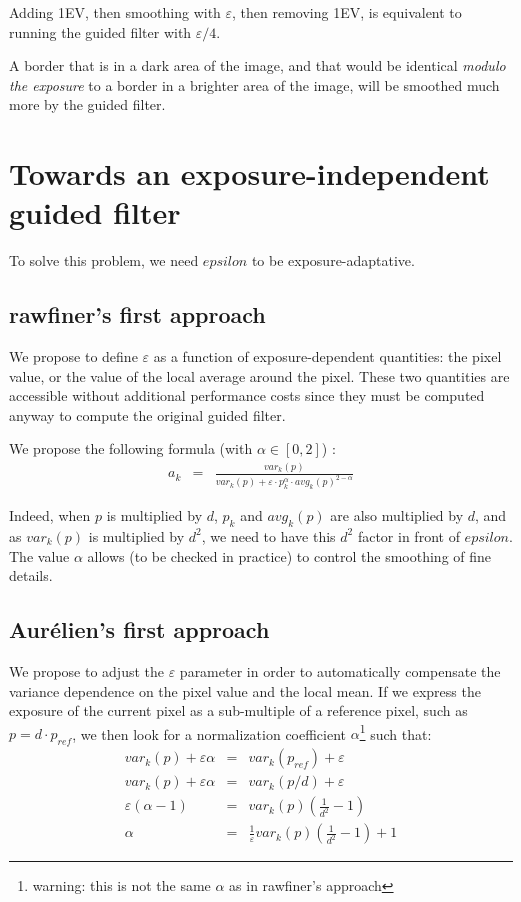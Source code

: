 \documentclass[12pt,a4paper]{article}
\begin{document}
Adding 1EV, then smoothing with $\varepsilon$, then removing 1EV, is equivalent to running the guided filter with $\varepsilon / 4$.

A border that is in a dark area of the image, and that would be identical \textit{modulo the exposure} to a border in a brighter area of the image, will be smoothed much more by the guided filter.

\section{Towards an exposure-independent guided filter}
To solve this problem, we need $epsilon$ to be exposure-adaptative.

\subsection{rawfiner's first approach}
We propose to define $\varepsilon$ as a function of exposure-dependent quantities: the pixel value, or the value of the local average around the pixel.
These two quantities are accessible without additional performance costs since they must be computed anyway to compute the original guided filter.

We propose the following formula (with $\alpha \in [0,2]$) :
\begin{eqnarray}
a_k &=& \frac{var_k(p)}{var_k(p) + \varepsilon  \cdot  p_k ^ {\alpha}  \cdot  avg_k(p) ^ {2-\alpha}} \label{first-formula}
\end{eqnarray}

Indeed, when $p$ is multiplied by $d$, $p_k$ and $avg_k(p)$ are also multiplied by $d$, and as $var_k(p)$ is multiplied by $d^2$, we need to have this $d^2$ factor in front of $epsilon$.
The value $\alpha$ allows (to be checked in practice) to control the smoothing of fine details.

\subsection{Aurélien's first approach}

We propose to adjust the $\varepsilon$ parameter in order to automatically compensate the variance dependence on the pixel value and the local mean. If we express the exposure of the current pixel as a sub-multiple of a reference pixel, such as $p = d  \cdot  p_{ref}$, we then look for a normalization coefficient $\alpha$\footnote{warning: this is not the same $\alpha$ as in rawfiner's approach} such that:
\begin{eqnarray}
var_k(p) + \varepsilon \alpha &=& var_k(p_{ref}) + \varepsilon \\
var_k(p) + \varepsilon \alpha &=& var_k(p / d) + \varepsilon\\
\varepsilon (\alpha - 1) &=&  var_k(p) \left( \frac{1}{d^2} - 1\right) \\
\alpha &=& \frac{1}{\varepsilon} var_k(p)  \left( \frac{1}{d^2} - 1\right) + 1
\end{eqnarray}
\end{document}
